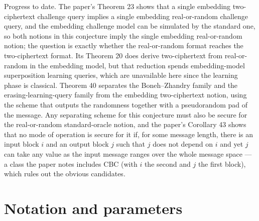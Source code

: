 \documentclass{conjura-conjecture}
\begin{document}
Progress to date. The paper's Theorem 23 shows that a single embedding
two-ciphertext challenge query implies a single embedding
real-or-random challenge query, and the embedding challenge model can be
simulated by the standard one, so both notions in this conjecture imply
the single embedding real-or-random notion; the question is exactly
whether the real-or-random format reaches the two-ciphertext format. Its
Theorem 20 does derive two-ciphertext from real-or-random in the
embedding model, but that reduction spends embedding-model superposition
learning queries, which are unavailable here since the learning phase is
classical. Theorem 40 separates the Boneh--Zhandry family and the
erasing-learning-query family from the embedding two-ciphertext notion,
using the scheme that outputs the randomness together with a
pseudorandom pad of the message. Any separating scheme for this
conjecture must also be secure for the real-or-random standard-oracle
notion, and the paper's Corollary 43 shows that no mode of operation is
secure for it if, for some message length, there is an input block $i$
and an output block $j$ such that $j$ does not depend on $i$ and yet $j$
can take any value as the input message ranges over the whole message
space --- a class the paper notes includes CBC (with $i$ the second and
$j$ the first block), which rules out the obvious candidates.

\section{Notation and parameters}\label{sec:notation}
\end{document}
